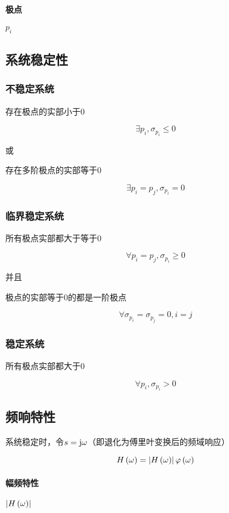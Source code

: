 \documentclass{article}
\begin{document}
\paragraph{极点}$p_i$

\subsection{系统稳定性}

\subsubsection{不稳定系统}

存在极点的实部小于0

\[\exists p_i,\sigma_{p_i}\leqslant0\]

或

存在多阶极点的实部等于0

\[\exists p_i=p_j,\sigma_{p_i}=0\]

\subsubsection{临界稳定系统}

所有极点实部都大于等于0

\[\forall p_i=p_j,\sigma_{p_i}\geqslant0\]

并且

极点的实部等于0的都是一阶极点

\[\forall \sigma_{p_i}=\sigma_{p_j}=0,i=j\]

\subsubsection{稳定系统}

所有极点实部都大于0

\[\forall p_i,\sigma_{p_i}>0\]

\subsection{频响特性}

系统稳定时，令$s=\mathrm j\omega$（即退化为傅里叶变换后的频域响应）

\[H\left(\omega\right)=\left|H\left(\omega\right)\right|\varphi\left(\omega\right)\]

\paragraph{幅频特性}$\left|H\left(\omega\right)\right|$
\end{document}

